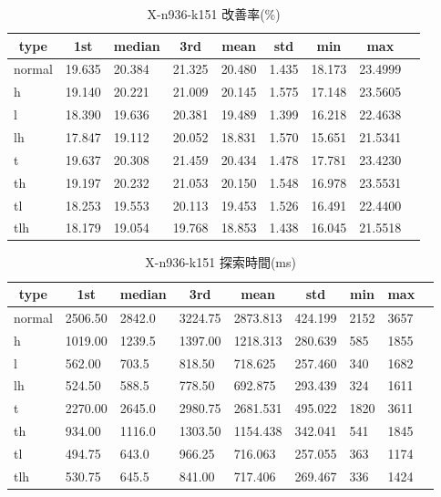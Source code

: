 \begin{table}[htbp]
    \caption{X-n936-k151 改善率(\%)}
    \begin{tabular}{|l|l|l|l|l|l|l|l|l|}\hline
    \multicolumn{1}{|c|}{\textbf{type}}
    &\multicolumn{1}{|c|}{\textbf{1st}}
    &\multicolumn{1}{c|}{\textbf{median}}
    &\multicolumn{1}{c|}{\textbf{3rd}}
    &\multicolumn{1}{c|}{\textbf{mean}}
    &\multicolumn{1}{c|}{\textbf{std}}
    &\multicolumn{1}{c|}{\textbf{min}}
    &\multicolumn{1}{c|}{\textbf{max}}\\\hline
	normal & 19.635 & 20.384 & 21.325 & 20.480 & 1.435 & 18.173 & 23.4999\\\hline
	h & 19.140 & 20.221 & 21.009 & 20.145 & 1.575 & 17.148 & 23.5605\\\hline
	l & 18.390 & 19.636 & 20.381 & 19.489 & 1.399 & 16.218 & 22.4638\\\hline
	lh & 17.847 & 19.112 & 20.052 & 18.831 & 1.570 & 15.651 & 21.5341\\\hline
	t & 19.637 & 20.308 & 21.459 & 20.434 & 1.478 & 17.781 & 23.4230\\\hline
	th & 19.197 & 20.232 & 21.053 & 20.150 & 1.548 & 16.978 & 23.5531\\\hline
	tl & 18.253 & 19.553 & 20.113 & 19.453 & 1.526 & 16.491 & 22.4400\\\hline
	tlh & 18.179 & 19.054 & 19.768 & 18.853 & 1.438 & 16.045 & 21.5518\\\hline
	\end{tabular}
\end{table}
\begin{table}[htbp]
    \caption{X-n936-k151 探索時間(ms)}
    \begin{tabular}{|l|l|l|l|l|l|l|l|l|}\hline
    \multicolumn{1}{|c|}{\textbf{type}}
    &\multicolumn{1}{|c|}{\textbf{1st}}
    &\multicolumn{1}{c|}{\textbf{median}}
    &\multicolumn{1}{c|}{\textbf{3rd}}
    &\multicolumn{1}{c|}{\textbf{mean}}
    &\multicolumn{1}{c|}{\textbf{std}}
    &\multicolumn{1}{c|}{\textbf{min}}
    &\multicolumn{1}{c|}{\textbf{max}}\\\hline
	normal & 2506.50 & 2842.0 & 3224.75 & 2873.813 & 424.199 & 2152 & 3657\\\hline
	h & 1019.00 & 1239.5 & 1397.00 & 1218.313 & 280.639 & 585 & 1855\\\hline
	l & 562.00 & 703.5 & 818.50 & 718.625 & 257.460 & 340 & 1682\\\hline
	lh & 524.50 & 588.5 & 778.50 & 692.875 & 293.439 & 324 & 1611\\\hline
	t & 2270.00 & 2645.0 & 2980.75 & 2681.531 & 495.022 & 1820 & 3611\\\hline
	th & 934.00 & 1116.0 & 1303.50 & 1154.438 & 342.041 & 541 & 1845\\\hline
	tl & 494.75 & 643.0 & 966.25 & 716.063 & 257.055 & 363 & 1174\\\hline
	tlh & 530.75 & 645.5 & 841.00 & 717.406 & 269.467 & 336 & 1424\\\hline
	\end{tabular}
\end{table}
